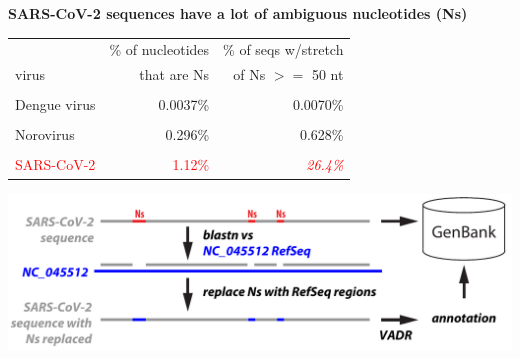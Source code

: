 \documentclass[landscape]{slides}
\begin{document}
\begin{slide}
\begin{center}
\textbf{SARS-CoV-2 sequences have a lot of ambiguous nucleotides (Ns)}
\end{center}

\begin{center}
\begin{tabular}{lrr}
            & \% of nucleotides & \% of seqs w/stretch \\
  virus     & that are Ns       & of Ns $>=$ 50 nt     \\ \hline
& & \\
Dengue virus  & 0.0037\%        & 0.0070\%             \\
& & \\                    
Norovirus     & 0.296\%         & 0.628\%             \\
& & \\                    
\textcolor{red}{SARS-CoV-2}    & \textcolor{red}{1.12\%}          & \textcolor{red}{\emph{26.4\%}}       \\
\end{tabular}
\end{center}
\vfill

\begin{center}
\includegraphics[width=10.5in]{figs/vadr-r-option}
\end{center}

%
\vfill
\end{slide}
\end{document}
